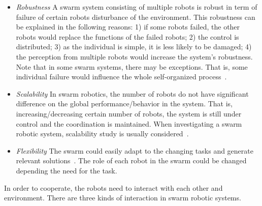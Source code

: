 \begin{itemize}

\item \textit{Robustness} A swarm system consisting of multiple robots is robust in term of failure of certain robots disturbance of the environment. This robustness can be explained in the following reasons: 1) if some robots failed, the other robots would replace the functions of the failed robots; 2) the control is distributed; 3) as the individual is simple, it is less likely to be damaged; 4) the perception from multiple robots would increase the system's robustness. Note that in some swarm systems, there may be exceptions. That is, some individual failure would influence the whole self-organized process~\cite{Bjerknes2013}.

\item \textit{Scalability} In swarm robotics, the number of robots do not have significant difference on the global performance/behavior in the system. That is, increasing/decreasing certain number of robots, the system is still under control and the coordination is maintained. When investigating a swarm robotic system, scalability study is usually considered~\cite{Jianing:TRO:2015, Melvin_DARS2014}.

\item \textit{Flexibility} The swarm could easily adapt to the changing tasks and generate relevant solutions~\cite{Sahin:LNCS:2005}. The role of each robot in the swarm could be changed depending the need for the task. 
\end{itemize}

In order to cooperate, the robots need to interact with each other and environment. There are three kinds of interaction in swarm robotic systems. 

